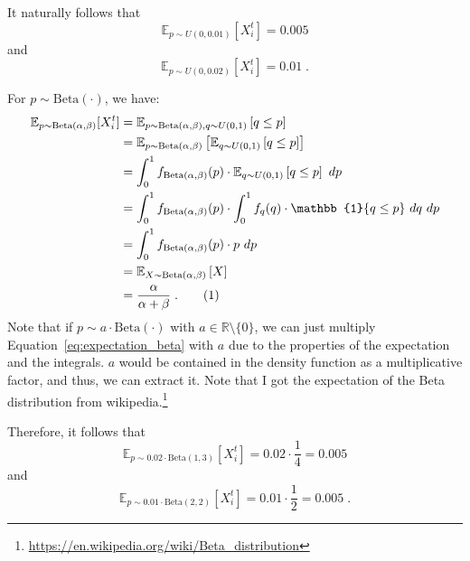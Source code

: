 \documentclass{article}
\newcommand{\stepandtag}{%
  \refstepcounter{equation}%
  \tag{\theequation}%
}
\begin{document}
It naturally follows that 
\begin{equation}
    \mathbb{E}_{p \sim U(0, 0.01)}[X_i^t] = 0.005
    \label{eq:expectation_xi_u01}
\end{equation}
and
\begin{equation}
    \mathbb{E}_{p \sim U(0, 0.02)}[X_i^t] = 0.01\;.
    \label{eq:expectation_xi_u02}
\end{equation}

For $p\sim \mathrm{Beta}(\cdot)$, we have:
\begin{align*}
    \mathbb{E}_{p \sim \mathrm{Beta}(\alpha, \beta)}[X_i^t] &= \mathbb{E}_{p \sim \mathrm{Beta}(\alpha, \beta), q\sim U(0, 1)}\left[ q \leq p \right] \\
    &= \mathbb{E}_{p \sim \mathrm{Beta}(\alpha, \beta)}\left[ \mathbb{E}_{q\sim U(0, 1)} \left[ q \leq p \right] \right] \\
    &= \int_0^1 f_{\mathrm{Beta}(\alpha, \beta)}(p) \cdot \mathbb{E}_{q\sim U(0, 1)} \left[ q \leq p \right]\ dp\\
    &= \int_0^1 f_{\mathrm{Beta}(\alpha, \beta)}(p) \cdot \int_0^1 f_q(q) \cdot \mathbb{1}\{q \leq p\} \ dq \ dp\\
    &= \int_0^1 f_{\mathrm{Beta}(\alpha, \beta)}(p) \cdot p \  dp \\
    &= \mathbb{E}_{X\sim \mathrm{Beta}(\alpha, \beta)}\left[ X \right] \\
    &= \frac{\alpha}{\alpha + \beta}\;. 
    \stepandtag \label{eq:expectation_beta}
\end{align*}
Note that if $p\sim a \cdot \mathrm{Beta}(\cdot)$ with $a\in \mathbb{R} \setminus \{0\}$, we can just multiply Equation~\ref{eq:expectation_beta} with $a$ due to the properties of the expectation and the integrals. $a$ would be contained in the density function as a multiplicative factor, and thus, we can extract it.
Note that I got the expectation of the Beta distribution from wikipedia.\!\footnote{\url{https://en.wikipedia.org/wiki/Beta_distribution}}

Therefore, it follows that 
\begin{equation}
    \mathbb{E}_{p \sim 0.02 \cdot \mathrm{Beta}(1, 3)}[X_i^t] = 0.02 \cdot \frac{1}{4} = 0.005
    \label{eq:expectation_xi_beta13}
\end{equation}
and 
\begin{equation}
    \mathbb{E}_{p \sim 0.01 \cdot \mathrm{Beta}(2, 2)}[X_i^t] = 0.01 \cdot \frac{1}{2} = 0.005\;.
    \label{eq:expectation_xi_beta22}
\end{equation}
\end{document}
